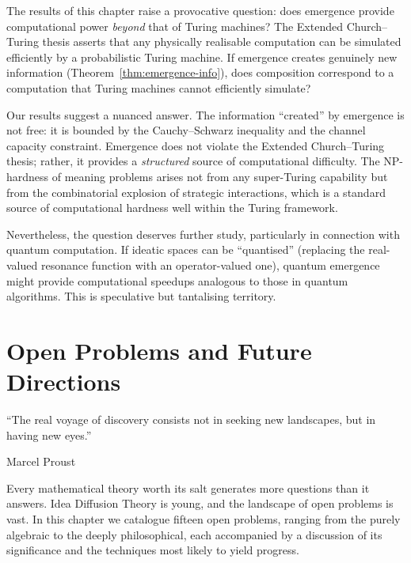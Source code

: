 \begin{remark}
The results of this chapter raise a provocative question: does
emergence provide computational power \emph{beyond} that of Turing
machines?  The Extended Church--Turing thesis asserts that any
physically realisable computation can be simulated efficiently by a
probabilistic Turing machine.  If emergence creates genuinely new
information (Theorem~\ref{thm:emergence-info}), does composition
correspond to a computation that Turing machines cannot efficiently
simulate?

Our results suggest a nuanced answer.  The information ``created'' by
emergence is not free: it is bounded by the Cauchy--Schwarz inequality
and the channel capacity constraint.  Emergence does not violate the
Extended Church--Turing thesis; rather, it provides a \emph{structured}
source of computational difficulty.  The NP-hardness of meaning
problems arises not from any super-Turing capability but from the
combinatorial explosion of strategic interactions, which is a standard
source of computational hardness well within the Turing framework.

Nevertheless, the question deserves further study, particularly in
connection with quantum computation.  If ideatic spaces can be
``quantised'' (replacing the real-valued resonance function with an
operator-valued one), quantum emergence might provide computational
speedups analogous to those in quantum algorithms.  This is
speculative but tantalising territory.
\end{remark}




\chapter{Open Problems and Future Directions}
\label{ch:open}

\epigraph{``The real voyage of discovery consists not in seeking
new landscapes, but in having new eyes.''}{Marcel Proust}

Every mathematical theory worth its salt generates more questions
than it answers.  Idea Diffusion Theory is young, and the landscape
of open problems is vast.  In this chapter we catalogue fifteen
open problems, ranging from the purely algebraic to the deeply
philosophical, each accompanied by a discussion of its significance
and the techniques most likely to yield progress.


